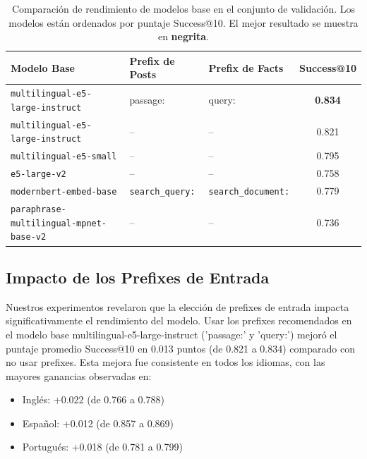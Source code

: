 \documentclass[11pt]{article}
\begin{document}
\begin{table}[t]
  \centering
  \small
  \begin{tabular}{p{5cm}p{3cm}p{3cm}c}
    \hline
    \textbf{Modelo Base} & \textbf{Prefix de Posts} & \textbf{Prefix de Facts} & \textbf{Success@10} \\
    \hline
    \texttt{multilingual-e5-large-instruct} \cite{wang2024multilingual} & passage: & query: & \textbf{0.834} \\
    \texttt{multilingual-e5-large-instruct} \cite{wang2024multilingual} & -- & -- & 0.821 \\
    \texttt{multilingual-e5-small} \cite{wang2024multilingual} & -- & -- & 0.795 \\
    \texttt{e5-large-v2} \cite{wang2022text} & -- & -- & 0.758 \\
    \texttt{modernbert-embed-base} \cite{nussbaum2024nomic} & \texttt{search\_query:} & \texttt{search\_document:} & 0.779 \\
    \texttt{paraphrase-multilingual-mpnet-base-v2} \cite{reimers2019sentence} & -- & -- & 0.736 \\
    \hline
  \end{tabular}
  \caption{Comparación de rendimiento de modelos base en el conjunto de validación. Los modelos están ordenados por puntaje Success@10. El mejor resultado se muestra en \textbf{negrita}.}
  \label{tab:base-models}
\end{table}

\subsection{Impacto de los Prefixes de Entrada}

Nuestros experimentos revelaron que la elección de prefixes de entrada impacta significativamente el rendimiento del modelo. Usar los prefixes recomendados en el modelo base multilingual-e5-large-instruct ('passage:' y 'query:') mejoró el puntaje promedio Success@10 en 0.013 puntos (de 0.821 a 0.834) comparado con no usar prefixes. Esta mejora fue consistente en todos los idiomas, con las mayores ganancias observadas en:

\begin{itemize}
    \item Inglés: +0.022 (de 0.766 a 0.788)
    \item Español: +0.012 (de 0.857 a 0.869)
    \item Portugués: +0.018 (de 0.781 a 0.799)
\end{itemize}
\end{document}
